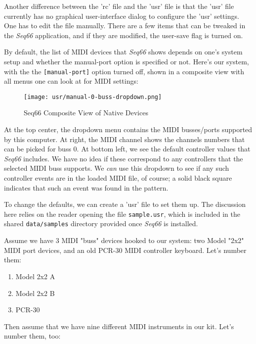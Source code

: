    Another difference between the 'rc' file and the 'usr' file is that
   the 'usr' file currently has no graphical user-interface dialog to
   configure the 'usr' settings.  One has to edit the file manually.
   There are a few items that can be tweaked in the \textsl{Seq66} application, and
   if they are modified, the user-save flag is turned on.

   By default, the list of MIDI devices that \textsl{Seq66} shows depends
   on one's system setup and whether the manual-port option is specified
   or not.  Here's our system, with the
   the \texttt{[manual-port]} option turned off, shown in a
   composite view with all menus one can look at for MIDI settings:

\begin{figure}[H]
   \centering 
   \texttt{[image: usr/manual-0-buss-dropdown.png]}
   \caption{Seq66 Composite View of Native Devices}
   \label{fig:manual_0_buss_dropdown}
\end{figure}

   At the top center, the dropdown menu contains the MIDI busses/ports
   supported by this computer.  At right, the MIDI channel shows
   the channels numbers that can be picked for buss 0.  At bottom left, we see
   the default controller values that \textsl{Seq66} includes.  We have
   no idea if these correspond to any controllers that the selected MIDI buss
   supports.  We \textsl{can} use this dropdown to see if any such controller
   events are in the loaded MIDI file, of course; a solid black square
   indicates that such an event was found in the pattern.

   To change the defaults, we can create a 'usr' file to set them up.
   The discussion here relies on the reader opening the file
   \texttt{sample.usr}, which is included in the shared \texttt{data/samples}
   directory provided once \textsl{Seq66} is installed.

   Assume we have 3 MIDI "buss" devices hooked to our system:
   two Model "2x2" MIDI port devices, and an old PCR-30 MIDI controller
   keyboard.  Let's number them:

   \begin{enumerate}
      \item Model 2x2 A
      \item Model 2x2 B
      \item PCR-30
   \end{enumerate}

   Then assume that we have nine different MIDI instruments in our kit.
   Let's number them, too:

